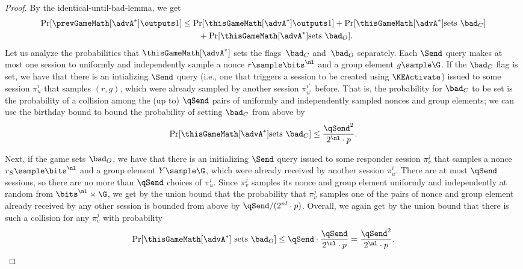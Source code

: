 \begin{proof}
	By the identical-until-bad-lemma, we get
	\begin{align}\label{eq:game:hello-coll-raw}\nonumber
		\Pr[ \prevGameMath[\advA^*] \outputs 1 ] &\leq \Pr[ \thisGameMath[\advA^*] \outputs 1 ] + \Pr[ \thisGameMath[\advA^*] \text{sets } \bad_C ] \\ 
		&\qquad+ \Pr[ \thisGameMath[\advA^*] \text{sets } \bad_O ] .
	\end{align}
	Let us analyze the probabilities that $\thisGameMath[\advA^*]$ sets the flags~$\bad_C$ and~$\bad_O$ separately.
	Each $\Send$ query makes at most one session to uniformly and independently sample a nonce $r \sample \bits^{\nl}$ and a group element $g \sample \G$. 
	If the $\bad_C$ flag is set, we have that there is an intializing $\Send$ query (i.e., one that triggers a session to be created using $\KEActivate$) issued to some session $\pi_u^i$ that samples $(r, g)$, which were already sampled by another session $\pi_{u'}^{i'}$ before.
	That is, the probability for $\bad_C$ to be set is the probability of a collision among the (up to) $\qSend$ pairs of uniformly and independently sampled nonces and group elements; we can use the birthday bound to bound the probability of setting $\bad_C$ from above by
	\begin{equation}\label{eq:badC}
		\Pr[ \thisGameMath[\advA^*] \text{sets } \bad_C ]  \leq \frac{\qSend^2}{2^{\nl} \cdot p}.
	\end{equation}
	
	Next, if the game sets $\bad_O$, we have that there is an initializing $\Send$ query issued to some responder session $\pi_v^j$ that samples a nonce $r_S \sample \bits^{\nl}$ and a group element $Y \sample \G$, which were already received by another session $\pi_u^i$.
	There are at most $\qSend$ sessions, so there are no more than $\qSend$ choices of $\pi_u^i$.
	Since $\pi_v^j$ samples its nonce and group element uniformly and independently at random from $\bits^{\nl} \times \G$, we get by the union bound that the probability that $\pi_v^j$ samples one of the pairs of nonce and group element already received by any other session is bounded from above by $\qSend / (2^{nl} \cdot p)$.
	Overall, we again get by the union bound that there is such a collision for any $\pi_v^j$ with probability
	\begin{equation}\label{eq:badO}
		\Pr[ \thisGameMath[\advA^*] \text{ sets } \bad_O ]  \leq \qSend \cdot \frac{\qSend}{2^{\nl} \cdot p} = \frac{\qSend^2}{2^{\nl} \cdot p}.
	\end{equation}
	

\end{proof}
